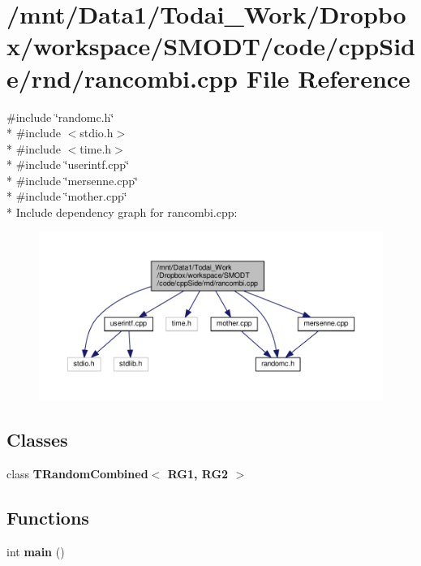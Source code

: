 \section{/mnt/\-Data1/\-Todai\-\_\-\-Work/\-Dropbox/workspace/\-S\-M\-O\-D\-T/code/cpp\-Side/rnd/rancombi.cpp File Reference}
\label{rnd_2rancombi_8cpp}
{\ttfamily \#include \char`\"{}randomc.\-h\char`\"{}}\\*
{\ttfamily \#include $<$stdio.\-h$>$}\\*
{\ttfamily \#include $<$time.\-h$>$}\\*
{\ttfamily \#include \char`\"{}userintf.\-cpp\char`\"{}}\\*
{\ttfamily \#include \char`\"{}mersenne.\-cpp\char`\"{}}\\*
{\ttfamily \#include \char`\"{}mother.\-cpp\char`\"{}}\\*
Include dependency graph for rancombi.\-cpp\-:\nopagebreak
\begin{figure}[H]
\begin{center}
\leavevmode
\includegraphics[width=350pt]{rnd_2rancombi_8cpp__incl}
\end{center}
\end{figure}
\subsection*{Classes}
\begin{DoxyCompactItemize}
\item 
class {\bf T\-Random\-Combined$<$ R\-G1, R\-G2 $>$}
\end{DoxyCompactItemize}
\subsection*{Functions}
\begin{DoxyCompactItemize}
\item 
int {\bf main} ()
\end{DoxyCompactItemize}


